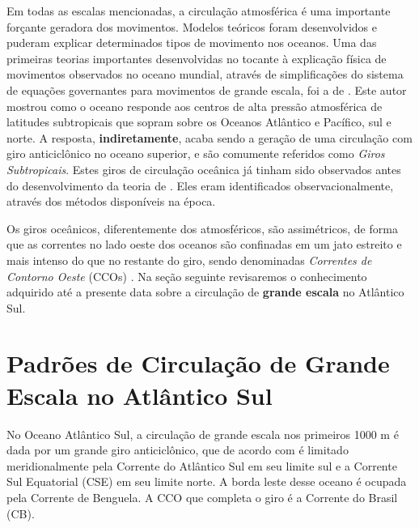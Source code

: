 
Em todas as escalas mencionadas, a circulação atmosférica é uma importante for\-çan\-te
geradora dos movimentos.  Modelos teóricos foram desenvolvidos e puderam 
explicar determinados tipos de movimento nos oceanos. Uma das primeiras teorias importantes
desenvolvidas no tocante à explicação física de movimentos observados no oceano mundial,
 através de simplificações do sistema de equações governantes para movimentos de grande escala, foi a 
de \cite{sverdrup1947}. Este autor mostrou como o oceano responde aos centros de alta pressão atmosférica 
de latitudes subtropicais 
que sopram sobre os Oceanos Atlântico e Pacífico, sul e norte. A resposta, {\bf indiretamente},
acaba sendo a geração de uma circulação com giro anticiclônico no oceano superior,
e são comumente referidos como {\it Giros Subtropicais}. Estes giros de circulação oceânica já tinham sido 
observados antes do desenvolvimento da teoria de \cite{sverdrup1947}. Eles eram identificados
observacionalmente, através dos métodos disponíveis na época. 

Os giros oceânicos, diferentemente dos atmosféricos, são assimétricos, de forma
que as correntes no lado oeste dos oceanos são confinadas em um jato estreito
e mais intenso do que no restante do giro, sendo denominadas {\it Correntes de Contorno
Oeste} (CCOs) \citep{stommel1948,munk1950}. Na seção seguinte revisaremos o conhecimento adquirido até a presente data
sobre a circulação de {\bf grande escala} no Atlântico Sul.

\section{Padrões de Circulação de Grande Escala no Atlântico Sul}\label{sec:largesc}

\hspace{6mm} No Oceano Atlântico Sul, a circulação de grande escala nos primeiros 1000 m é dada por um grande 
giro anticiclônico, que de acordo com \cite{stramma_england1999} é limitado meridionalmente pela Corrente do Atlântico Sul em seu limite sul e a Corrente Sul Equatorial (CSE) em seu limite norte. A borda leste
desse oceano é ocupada pela Corrente de Benguela. A CCO
que completa o giro é a Corrente do Brasil (CB).

